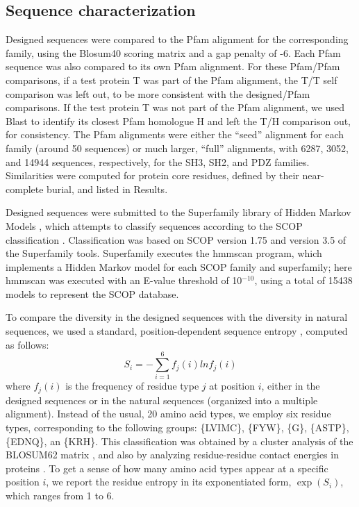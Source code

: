 \documentclass[a4paper,12pt]{article}
\begin{document}
\subsection{Sequence characterization}
Designed sequences were compared to the Pfam alignment for the corresponding family, using the Blosum40 scoring
matrix and a gap penalty of -6. Each Pfam sequence was also compared to its own Pfam alignment. For these Pfam/Pfam
comparisons, if a test protein T was part of the Pfam alignment, the T/T self comparison was left out, to be more
consistent with the designed/Pfam comparisons. If the test protein T was not part of the Pfam alignment, we used
Blast to identify its closest Pfam homologue H and left the T/H comparison out, for consistency. The Pfam alignments
were either the ``seed'' alignment for each family (around 50 sequences) or much larger, ``full'' alignments, with
6287, 3052, and 14944 sequences, respectively, for the SH3, SH2, and PDZ families. Similarities were computed for
protein core residues, defined by their near-complete burial, and listed in Results.

Designed sequences were submitted to the Superfamily library of Hidden Markov Models \cite{Gough01,Wilson07},
which attempts to classify sequences according to the SCOP classification \cite{Andreeva04}. Classification
was based on SCOP version 1.75 and version 3.5 of the Superfamily tools. Superfamily executes the hmmscan
program, which implements a Hidden Markov model for each SCOP family and superfamily; here hmmscan was executed
with an E-value threshold of 10$^{-10}$, using a total of 15438 models to represent the SCOP database.

To compare the diversity in the designed sequences with the diversity in natural sequences, we used a standard,
position-dependent sequence entropy \cite{DurbinBK}, computed as follows:
\begin{equation} \label{eq:entropy}
S_i = - \sum_{i=1}^6 f_j (i) ln f_j (i)
\end{equation}
where $f_j(i)$ is the frequency of residue type $j$ at position $i$, either in the designed sequences or in the
natural sequences (organized into a multiple alignment). Instead of the usual, 20 amino acid types, we employ
six residue types, corresponding to the following groups: \{LVIMC\}, \{FYW\}, \{G\}, \{ASTP\}, \{EDNQ\}, an
\{KRH\}. This classification was obtained by a cluster analysis of the BLOSUM62 matrix \cite{Murphy02}, and also
by analyzing residue-residue contact energies in proteins \cite{Launay07}. To get a sense of how many amino acid
types appear at a specific position $i$, we report the residue entropy in its exponentiated form, $\exp(S_i)$,
which ranges from 1 to 6. 
\end{document}
